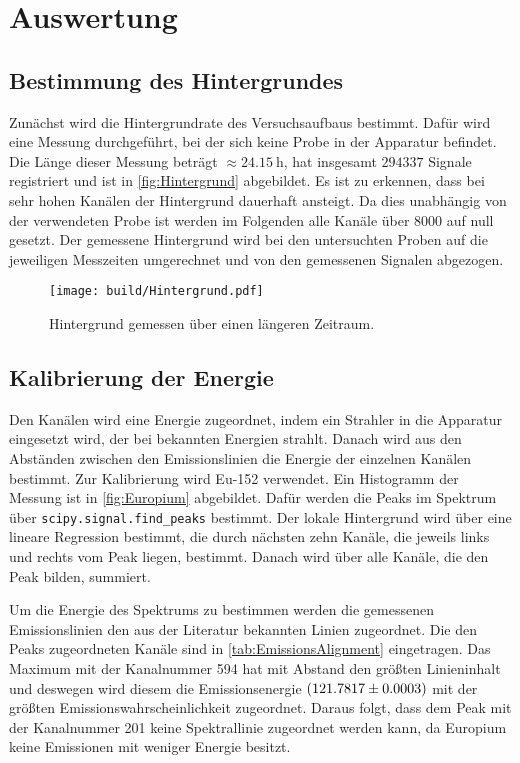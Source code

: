 \section{Auswertung}
\label{sec:auswertung}

\subsection{Bestimmung des Hintergrundes}

Zunächst wird die Hintergrundrate des Versuchsaufbaus bestimmt. Dafür wird eine Messung durchgeführt, bei der sich keine Probe in der Apparatur befindet.
Die Länge dieser Messung beträgt $\approx \SI{24.15}{\hour}$, hat insgesamt $294337$ Signale registriert und ist in \autoref{fig:Hintergrund} abgebildet. 
Es ist zu erkennen, dass bei sehr hohen Kanälen der Hintergrund dauerhaft ansteigt. Da dies unabhängig von der verwendeten Probe ist werden im Folgenden alle Kanäle über $8000$ auf null gesetzt.
Der gemessene Hintergrund wird bei den untersuchten Proben auf die jeweiligen Messzeiten umgerechnet und von den gemessenen Signalen abgezogen.  

\begin{figure}[H]
    \centering
    \texttt{[image: build/Hintergrund.pdf]}
    \caption{Hintergrund gemessen über einen längeren Zeitraum.}
    \label{fig:Hintergrund}
\end{figure}


\subsection{Kalibrierung der Energie}

Den Kanälen wird eine Energie zugeordnet, indem ein Strahler in die Apparatur eingesetzt wird, der bei bekannten Energien strahlt. 
Danach wird aus den Abständen zwischen den Emissionslinien die Energie der einzelnen Kanälen bestimmt.  
Zur Kalibrierung wird Eu-152 verwendet.
Ein Histogramm der Messung ist in \autoref{fig:Europium} abgebildet.
Dafür werden die Peaks im Spektrum über \texttt{scipy.signal.find\_peaks} \cite{scipy} bestimmt.
Der lokale Hintergrund wird über eine lineare Regression bestimmt, die durch nächsten zehn Kanäle, die jeweils links und rechts vom Peak liegen, bestimmt.
Danach wird über alle Kanäle, die den Peak bilden, summiert.

Um die Energie des Spektrums zu bestimmen werden die gemessenen Emissionslinien den aus der Literatur \cite{LNHB} bekannten Linien zugeordnet.
Die den Peaks zugeordneten Kanäle sind in \autoref{tab:EmissionsAlignment} eingetragen.
Das Maximum mit der Kanalnummer 594 hat mit Abstand den größten Linieninhalt und deswegen wird diesem die Emissionsenergie $\SI{121.7817 \pm 0.0003}{}$ mit der größten Emissionswahrscheinlichkeit zugeordnet.
Daraus folgt, dass dem Peak mit der Kanalnummer 201 keine Spektrallinie zugeordnet werden kann, da Europium keine Emissionen mit weniger Energie besitzt.

